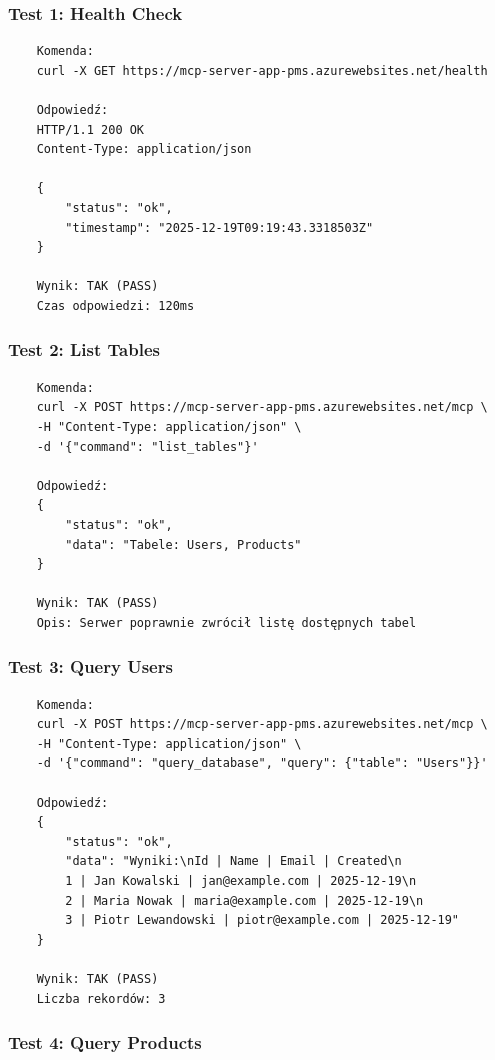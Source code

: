\documentclass[twoside]{article}
\begin{document}
\subsubsection{Test 1: Health Check}

\begin{verbatim}
	Komenda:
	curl -X GET https://mcp-server-app-pms.azurewebsites.net/health
	
	Odpowiedź:
	HTTP/1.1 200 OK
	Content-Type: application/json
	
	{
		"status": "ok",
		"timestamp": "2025-12-19T09:19:43.3318503Z"
	}
	
	Wynik: TAK (PASS)
	Czas odpowiedzi: 120ms
\end{verbatim}

\subsubsection{Test 2: List Tables}

\begin{verbatim}
	Komenda:
	curl -X POST https://mcp-server-app-pms.azurewebsites.net/mcp \
	-H "Content-Type: application/json" \
	-d '{"command": "list_tables"}'
	
	Odpowiedź:
	{
		"status": "ok",
		"data": "Tabele: Users, Products"
	}
	
	Wynik: TAK (PASS)
	Opis: Serwer poprawnie zwrócił listę dostępnych tabel
\end{verbatim}

\subsubsection{Test 3: Query Users}

\begin{verbatim}
	Komenda:
	curl -X POST https://mcp-server-app-pms.azurewebsites.net/mcp \
	-H "Content-Type: application/json" \
	-d '{"command": "query_database", "query": {"table": "Users"}}'
	
	Odpowiedź:
	{
		"status": "ok",
		"data": "Wyniki:\nId | Name | Email | Created\n
		1 | Jan Kowalski | jan@example.com | 2025-12-19\n
		2 | Maria Nowak | maria@example.com | 2025-12-19\n
		3 | Piotr Lewandowski | piotr@example.com | 2025-12-19"
	}
	
	Wynik: TAK (PASS)
	Liczba rekordów: 3
\end{verbatim}

\subsubsection{Test 4: Query Products}
\end{document}
